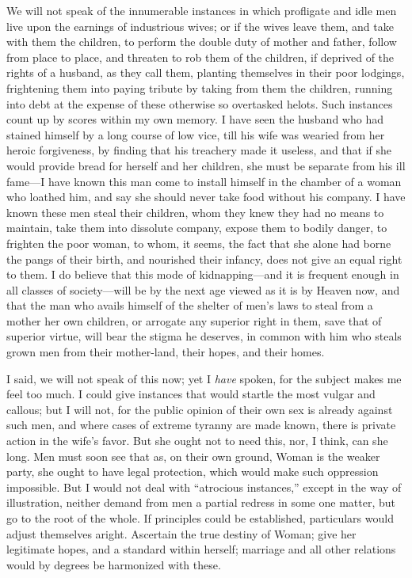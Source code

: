 We will not speak of the innumerable instances in  which
profligate and idle men live upon the earnings of industrious wives;
or if the wives leave them, and take with them the children, to
perform the double duty of mother and father, follow from place to
place, and threaten to rob them of the children, if deprived of the
rights of a husband, as they call them, planting themselves in their
poor lodgings, frightening them into paying tribute by taking from
them the children, running into debt at the expense of these otherwise
so overtasked helots. Such instances count up by scores within my own
memory. I have seen the husband who had stained himself by a long
course of low vice, till his wife was wearied from her heroic
forgiveness, by finding that his treachery made it useless, and that
if she would provide bread for herself and her children, she must be
separate from his ill fame---I have known this man come to install
himself in the chamber of a woman who loathed him, and say she should
never take food without his company. I have known these men steal
their children, whom they knew they had no means to maintain, take
them into dissolute company, expose them to bodily danger, to frighten
the poor woman, to whom, it seems, the fact that she alone had borne
the pangs of their birth, and nourished their infancy, does not give
an equal right to them. I do believe that this mode of
kid\-nap\-ping---and it is frequent enough in all classes of
so\-ci\-ety---will be by the next age viewed as it is by Heaven now,
and that the man who avails himself of the shelter of men's laws to
steal from a mother her own children, or arrogate any superior right
in them, save that of superior  virtue, will bear the stigma
he deserves, in common with him who steals grown men from their
mother-land, their hopes, and their homes.

I said, we will not speak of this now; yet I \textit{have} spoken, for
the subject makes me feel too much. I could give instances that would
startle the most vulgar and callous; but I will not, for the public
opinion of their own sex is already against such men, and where cases
of extreme tyranny are made known, there is private action in the
wife's favor. But she ought not to need this, nor, I think, can she
long. Men must soon see that as, on their own ground, Woman is the
weaker party, she ought to have legal protection, which would make
such oppression impossible. But I would not deal with ``atrocious
instances,'' except in the way of illustration, neither demand from
men a partial redress in some one matter, but go to the root of the
whole. If principles could be established, particulars would adjust
themselves aright. Ascertain the true destiny of Woman; give her
legitimate hopes, and a standard within herself; marriage and all
other relations would by degrees be harmonized with these.

